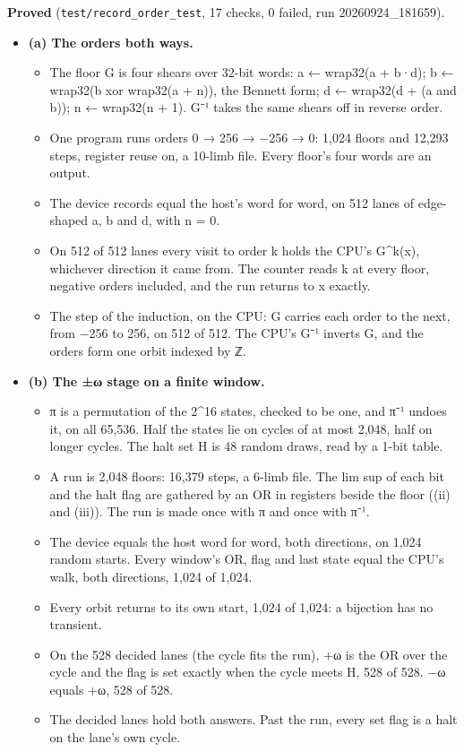 \textbf{Proved} (\texttt{test/\allowbreak{}record\_\allowbreak{}order\_\allowbreak{}test}, 17 checks, 0 failed, run 20260924\_\allowbreak{}181659).

\begin{itemize}
\item \textbf{(a) The orders both ways.}

\begin{itemize}
\item The floor G is four shears over 32-bit words: a ← wrap32(a + b·d); b ← wrap32(b xor wrap32(a + n)), the Bennett form; d ← wrap32(d + (a and b)); n ← wrap32(n + 1). G⁻¹ takes the same shears off in reverse order.
\item One program runs orders 0 → 256 → −256 → 0: 1,024 floors and 12,293 steps, register reuse on, a 10-limb file. Every floor's four words are an output.
\item The device records equal the host's word for word, on 512 lanes of edge-shaped a, b and d, with n = 0.
\item On 512 of 512 lanes every visit to order k holds the CPU's G\textasciicircum{}k(x), whichever direction it came from. The counter reads k at every floor, negative orders included, and the run returns to x exactly.
\item The step of the induction, on the CPU: G carries each order to the next, from −256 to 256, on 512 of 512. The CPU's G⁻¹ inverts G, and the orders form one orbit indexed by ℤ.
\end{itemize}
\item \textbf{(b) The ±ω stage on a finite window.}

\begin{itemize}
\item π is a permutation of the 2\textasciicircum{}16 states, checked to be one, and π⁻¹ undoes it, on all 65,536. Half the states lie on cycles of at most 2,048, half on longer cycles. The halt set H is 48 random draws, read by a 1-bit table.
\item A run is 2,048 floors: 16,379 steps, a 6-limb file. The lim sup of each bit and the halt flag are gathered by an OR in registers beside the floor ((ii) and (iii)). The run is made once with π and once with π⁻¹.
\item The device equals the host word for word, both directions, on 1,024 random starts. Every window's OR, flag and last state equal the CPU's walk, both directions, 1,024 of 1,024.
\item Every orbit returns to its own start, 1,024 of 1,024: a bijection has no transient.
\item On the 528 decided lanes (the cycle fits the run), +ω is the OR over the cycle and the flag is set exactly when the cycle meets H, 528 of 528. −ω equals +ω, 528 of 528.
\item The decided lanes hold both answers. Past the run, every set flag is a halt on the lane's own cycle.
\end{itemize}
\end{itemize}

